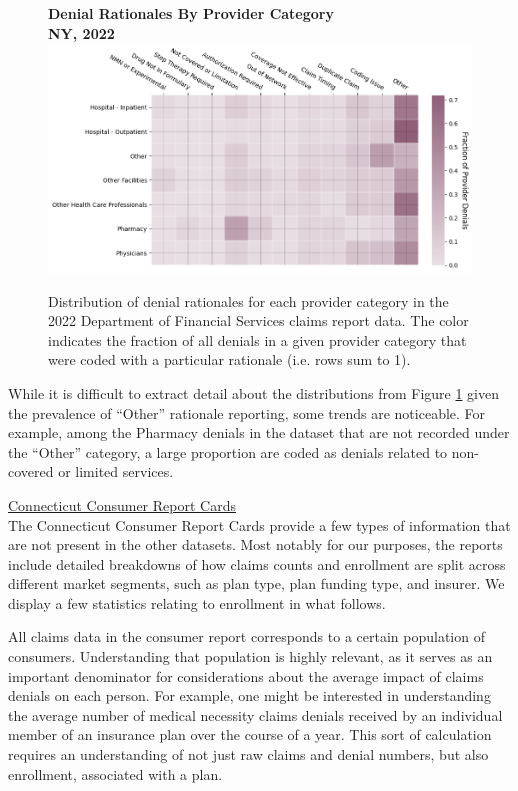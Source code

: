 \documentclass[12pt, a4paper,twoside,parskip=full]{report}
\theoremstyle{plain} %
\theoremstyle{definition} %
\theoremstyle{remark} %
\numberwithin{equation}{chapter}
\begin{document}
		
		\begin{figure}[h!]
			\centering
			\textbf{Denial Rationales By Provider Category}\\
			\textbf{NY, 2022}\\
			\includegraphics[width=\columnwidth]{images/ny_claim_reports/provider_cat_vs_denial_cat.png}
			\caption{Distribution of denial rationales for each provider category in the 2022 Department of Financial Services claims report data. The color indicates the fraction of all denials in a given provider category that were coded with a particular rationale (i.e. rows sum to 1).}
			\label{nyrationalesbyprovidercat}
		\end{figure}
	
		\clearpage
	
		While it is difficult to extract detail about the distributions from Figure \ref{nyrationalesbyprovidercat} given the prevalence of ``Other'' rationale reporting, some trends are noticeable. For example, among the Pharmacy denials in the dataset that are not recorded under the ``Other'' category, a large proportion are coded as denials related to non-covered or limited services.
		
		
		\underline{Connecticut Consumer Report Cards}\\
		
		The Connecticut Consumer Report Cards provide a few types of information that are not present in the other datasets. Most notably for our purposes, the reports include detailed breakdowns of how claims counts and enrollment are split across different market segments, such as plan type, plan funding type, and insurer. We display a few statistics relating to enrollment in what follows.
		
		All claims data in the consumer report corresponds to a certain population of consumers. Understanding that population is highly relevant, as it serves as an important denominator for considerations about the average impact of claims denials on each person. For example, one might be interested in understanding the average number of medical necessity claims denials received by an individual member of an insurance plan over the course of a year. This sort of calculation requires an understanding of not just raw claims and denial numbers, but also enrollment, associated with a plan.
		
\end{document}
